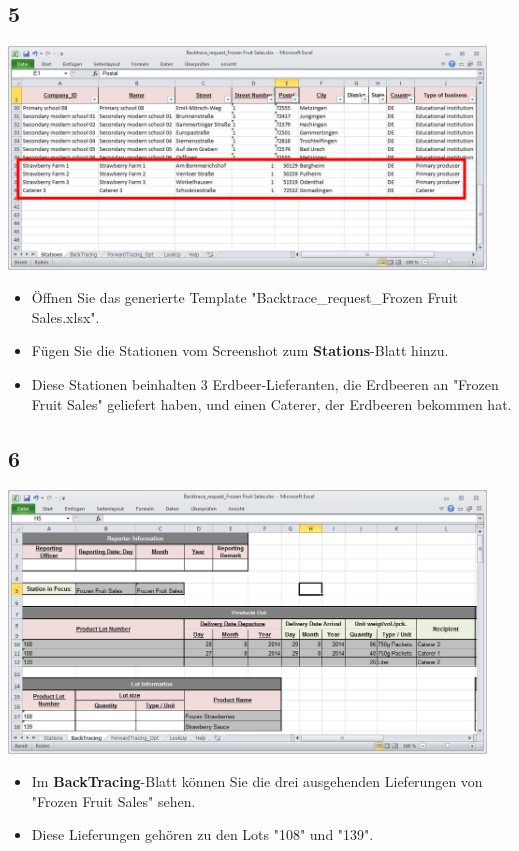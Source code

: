 \documentclass{beamer}
\begin{document}
\subsection{5}
\begin{frame}
	\begin{center}
  		\includegraphics[width=0.95\textwidth]{5.png}
	\end{center}
	\begin{itemize}
		\item Öffnen Sie das generierte Template "Backtrace\_request\_Frozen Fruit Sales.xlsx".
		\item Fügen Sie die Stationen vom Screenshot zum \textbf{Stations}-Blatt hinzu.
		\item Diese Stationen beinhalten 3 Erdbeer-Lieferanten, die Erdbeeren an "Frozen Fruit Sales" geliefert haben, und einen Caterer, der Erdbeeren bekommen hat.
	\end{itemize}
\end{frame}

\subsection{6}
\begin{frame}
	\begin{center}
  		\includegraphics[width=0.95\textwidth]{6.png}
	\end{center}
	\begin{itemize}
		\item Im \textbf{BackTracing}-Blatt können Sie die drei ausgehenden Lieferungen von "Frozen Fruit Sales" sehen.
		\item Diese Lieferungen gehören zu den Lots "108" und "139".
	\end{itemize}
\end{frame}
\end{document}
